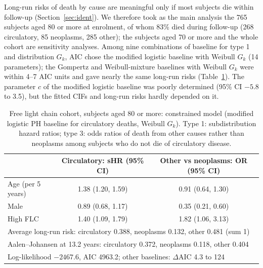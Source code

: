 \documentclass[11pt]{article}
\begin{document}
Long-run risks of death by cause are meaningful only if most subjects die within follow-up
(Section~\ref{sec:ident}). We therefore took as the main analysis the 765 subjects aged 80 or more at
enrolment, of whom 83\% died during follow-up (268 circulatory, 85 neoplasms, 285 other); the
subjects aged 70 or more and the whole cohort are sensitivity analyses. Among nine combinations of
baseline for type 1 and distribution $G_k$, AIC chose the modified logistic baseline with Weibull
$G_k$ (14 parameters); the Gompertz and Weibull-mixture baselines with Weibull $G_k$ were within
4--7 AIC units and gave nearly the same long-run risks (Table~\ref{tab:fl}). The parameter $c$ of the
modified logistic baseline was poorly determined (95\% CI $-5.8$ to 3.5), but the fitted CIFs and
long-run risks hardly depended on it.

\begin{table}[t]
\centering\small
\caption{Free light chain cohort, subjects aged 80 or more: constrained model (modified logistic PH
baseline for circulatory deaths, Weibull $G_k$). Type 1: subdistribution hazard ratios; type 3:
odds ratios of death from other causes rather than neoplasms among subjects who do not die of
circulatory disease.}
\label{tab:fl}
\begin{tabular}{lcc}
\toprule
 & Circulatory: sHR (95\% CI) & Other vs neoplasms: OR (95\% CI) \\
\midrule
Age (per 5 years) & 1.38 (1.20, 1.59) & 0.91 (0.64, 1.30) \\
Male              & 0.89 (0.68, 1.17) & 0.35 (0.21, 0.60) \\
High FLC          & 1.40 (1.09, 1.79) & 1.82 (1.06, 3.13) \\
\midrule
\multicolumn{3}{l}{Average long-run risk: circulatory 0.388, neoplasms 0.132, other 0.481 (sum 1)}\\
\multicolumn{3}{l}{Aalen--Johansen at 13.2 years: circulatory 0.372, neoplasms 0.118, other 0.404}\\
\multicolumn{3}{l}{Log-likelihood $-2467.6$, AIC 4963.2; other baselines: $\Delta$AIC 4.3 to 124}\\
\bottomrule
\end{tabular}
\end{table}
\end{document}

